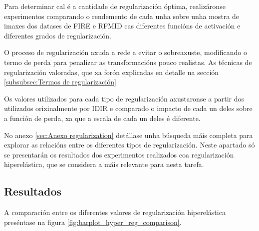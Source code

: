 Para determinar cal é a cantidade de regularización óptima, realizáronse experimentos comparando o rendemento de cada unha sobre unha mostra de imaxes dos datases de FIRE e RFMID cas diferentes funcións de activación e diferentes grados de regularización.

O proceso de regularización axuda a rede a evitar o sobreaxuste, modificando o termo de perda para penalizar as transformacións pouco realistas.
As técnicas de regularización valoradas, que xa forón explicadas en detalle na sección \ref{subsubsec:Termos de regularización}


Os valores utilizados para cada tipo de regularización axustaronse a partir dos utilizados orixinalmente por IDIR e comparado o impacto de cada un deles sobre a función de perda, xa que a escala de cada un deles é diferente.

No anexo \ref{sec:Anexo regularization} detállase unha búsqueda máis completa para explorar as relacións entre os diferentes tipos de regularización.
Neste apartado só se presentarán os resultados dos experimentos realizados coa regularización hiperelástica, que se considera a máis relevante para nesta tarefa.

\subsection{Resultados}
\label{subsec:Resultados-regularization}

A comparación entre os diferentes valores de regularización hiperelástica preséntase na figura \ref{fig:barplot_hyper_reg_comparison}.

